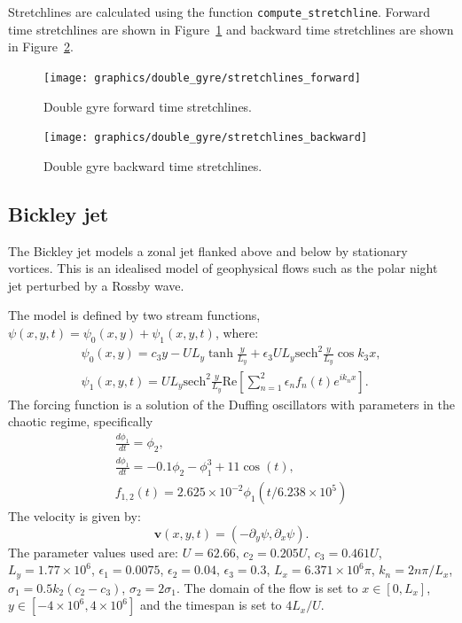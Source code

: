 \documentclass{article}
\begin{document}
Stretchlines are calculated using the function \texttt{compute\_stretchline}. Forward time stretchlines are shown in Figure~\ref{f:double gyre stretchlines forward} and backward time stretchlines are shown in Figure~\ref{f:double gyre stretchlines backward}.

\begin{figure}
\begin{center}
\texttt{[image: graphics/double\_gyre/stretchlines\_forward]}
\end{center}
\caption{Double gyre forward time stretchlines.}
\label{f:double gyre stretchlines forward}
\end{figure}

\begin{figure}
\begin{center}
\texttt{[image: graphics/double\_gyre/stretchlines\_backward]}
\end{center}
\caption{Double gyre backward time stretchlines.}
\label{f:double gyre stretchlines backward}
\end{figure}

\subsection{Bickley jet}

The Bickley jet models a zonal jet flanked above and below by
stationary vortices. This is an idealised model of geophysical flows
such as the polar night jet perturbed by a Rossby
wave\parencite{beron-vera10:_invar_lagran,haller12:_geodes_theor_trans_barrier_two_dimen_flows}.

The model is defined by two stream functions, $\psi(x,y,t) = \psi_0(x,y) + \psi_1(x,y,t)$, where:
\begin{gather*}
\psi_0(x,y) = c_3 y - U L_y \tanh\frac{y}{L_y} + \epsilon_3 U L_y \mathrm{sech}^2\frac{y}{L_y} \cos k_3 x,\\
\psi_1(x,y,t) = U L_y \mathrm{sech}^2\frac{y}{L_y} \mathrm{Re}\left[ \sum_{n=1}^2 \epsilon_n f_n(t) e^{i k_n x}\right].
\end{gather*}
The forcing function is a solution of the Duffing oscillators with parameters in the chaotic regime, specifically
\begin{gather*}
\frac{d \phi_1}{dt} = \phi_2,\\
\frac{d \phi_1}{dt} = -0.1 \phi_2 - \phi_1^3 + 11 \cos(t),\\
f_{1,2}(t) = 2.625 \times 10^{-2} \phi_1(t/6.238 \times 10^5)
\end{gather*}
The velocity is given by:
\[
\boldsymbol{v}(x,y,t) = (-\partial_y \psi, \partial_x \psi).
\]
The parameter values used are: $U = 62.66$, $c_2 = 0.205 U$, $c_3 = 0.461 U$, $L_y = 1.77 \times 10^6$, $\epsilon_1 = 0.0075$, $\epsilon_2 = 0.04$, $\epsilon_3 = 0.3$, $L_x = 6.371 \times 10^6 \pi$, $k_n = 2 n \pi/L_x$, $\sigma_1 = 0.5 k_2 (c_2 - c_3)$, $\sigma_2 = 2 \sigma_1$. The domain of the flow is set to $x \in [0,L_x]$, $y \in [-4 \times 10^6, 4 \times 10^6]$ and the timespan is set to $4 L_x/U$.
\end{document}
